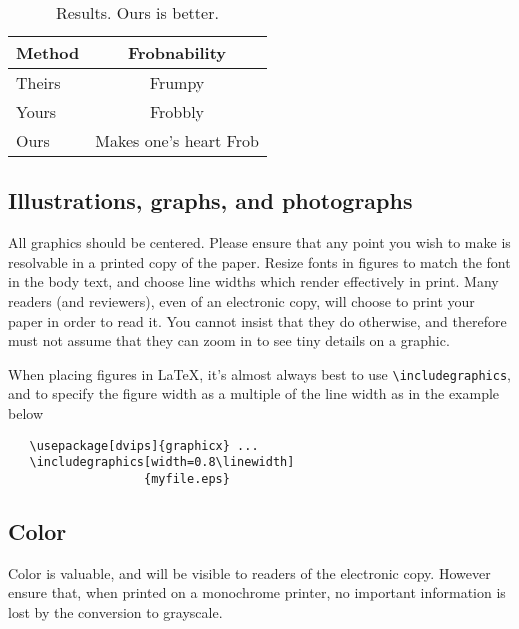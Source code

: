 \documentclass[10pt,twocolumn,letterpaper]{article}
\begin{document}
\begin{table}
\begin{center}
\begin{tabular}{|l|c|}
\hline
Method & Frobnability \\
\hline\hline
Theirs & Frumpy \\
Yours & Frobbly \\
Ours & Makes one's heart Frob\\
\hline
\end{tabular}
\end{center}
\caption{Results.   Ours is better.}
\end{table}

\subsection{Illustrations, graphs, and photographs}

All graphics should be centered.  Please ensure that any point you wish to
make is resolvable in a printed copy of the paper.  Resize fonts in figures
to match the font in the body text, and choose line widths which render
effectively in print.  Many readers (and reviewers), even of an electronic
copy, will choose to print your paper in order to read it.  You cannot
insist that they do otherwise, and therefore must not assume that they can
zoom in to see tiny details on a graphic.

When placing figures in \LaTeX, it's almost always best to use
\verb+\includegraphics+, and to specify the  figure width as a multiple of
the line width as in the example below
{\small\begin{verbatim}
   \usepackage[dvips]{graphicx} ...
   \includegraphics[width=0.8\linewidth]
                   {myfile.eps}
\end{verbatim}
}


\subsection{Color}

Color is valuable, and will be visible to readers of the electronic copy.
However ensure that, when printed on a monochrome printer, no important
information is lost by the conversion to grayscale.

{\small


}
\end{document}
